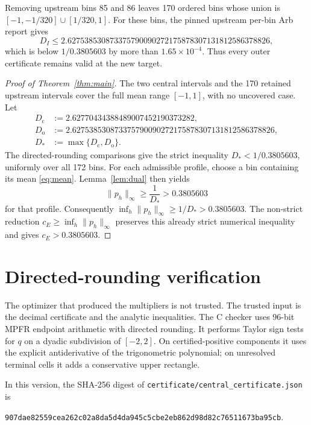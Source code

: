 \documentclass[11pt]{amsart}
\begin{document}
Removing upstream bins 85 and 86 leaves 170 ordered bins whose union is
$[-1,-1/320]\cup[1/320,1]$.  For these bins, the pinned upstream per-bin Arb
report gives
\[
 D_I\le2.627538530873375790090272175878307131812586378826,
\]
which is below $1/0.3805603$ by more than $1.65\times10^{-4}$.  Thus every
outer certificate remains valid at the new target.

\begin{proof}[Proof of Theorem~\ref{thm:main}]
The two central intervals and the 170 retained upstream intervals cover the
full mean range $[-1,1]$, with no uncovered case.  Let
\[
 \begin{aligned}
 D_{\mathrm c}&:=2.62770434388489007452190373282,\\
 D_{\mathrm o}&:=2.627538530873375790090272175878307131812586378826,\\
 D_*&:=\max\{D_{\mathrm c},D_{\mathrm o}\}.
 \end{aligned}
\]
The directed-rounding comparisons give the strict inequality
$D_*<1/0.3805603$, uniformly over all 172 bins.  For each admissible profile,
choose a bin containing its mean \eqref{eq:mean}.  Lemma~\ref{lem:dual}
then yields
\[
 \|p_h\|_\infty\ge \frac1{D_*}>0.3805603
\]
for that profile.  Consequently
$\inf_h\|p_h\|_\infty\ge1/D_*>0.3805603$.  The non-strict reduction
$c_E\ge\inf_h\|p_h\|_\infty$ preserves this already strict numerical
inequality and gives $c_E>0.3805603$.
\end{proof}

\section{Directed-rounding verification}

The optimizer that produced the multipliers is not trusted.  The trusted input
is the decimal certificate and the analytic inequalities.  The C checker uses
96-bit MPFR endpoint arithmetic with directed rounding.  It performs Taylor
sign tests for $q$ on a dyadic subdivision of $[-2,2]$.  On certified-positive
components it uses the explicit antiderivative of the trigonometric polynomial;
on unresolved terminal cells it adds a conservative upper rectangle.

In this version, the SHA-256 digest of
\texttt{certificate/central\_certificate.json} is
\begin{center}
\small\texttt{907dae82559cea262c02a8da5d4da945c5cbe2eb862d98d82c76511673ba95cb}.
\end{center}
\end{document}

